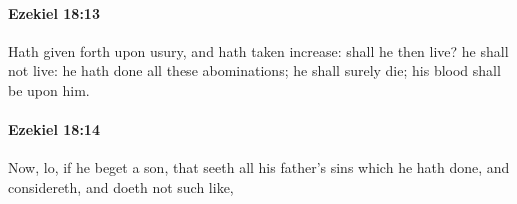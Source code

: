 		\paragraph{Ezekiel 18:13} %
			\label{EZEKIEL-18-13}

			Hath given forth upon usury, and hath taken increase: shall he then live? he shall not live: he hath done all these abominations; he shall surely die; his blood shall be upon him.


		\paragraph{Ezekiel 18:14} %
			\label{EZEKIEL-18-14}

			Now, lo, if he beget a son, that seeth all his father’s sins which he hath done, and considereth, and doeth not such like,


